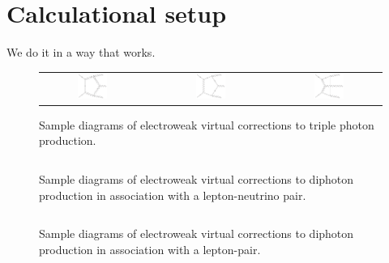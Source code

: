 \section{Calculational setup}
\label{sec:setup}

We do it in a way that works.

\begin{figure}[t!]
  \begin{tabular}{ccccc}
    \includegraphics[width=0.3\textwidth]{diagrams/aaa_V_1} & &
    \includegraphics[width=0.3\textwidth]{diagrams/aaa_V_2} & &
    \includegraphics[width=0.3\textwidth]{diagrams/aaa_V_3} \\
  \end{tabular}
  \caption{
    Sample diagrams of electroweak virtual corrections to triple 
    photon production.
  }
\end{figure}

\begin{figure}[t!]
  \begin{tabular}{ccccc}
  \end{tabular}
  \caption{
    Sample diagrams of electroweak virtual corrections to diphoton 
    production in association with a lepton-neutrino pair.
  }
\end{figure}

\begin{figure}[t!]
  \begin{tabular}{ccccc}
  \end{tabular}
  \caption{
    Sample diagrams of electroweak virtual corrections to diphoton 
    production in association with a lepton-pair.
  }
\end{figure}
